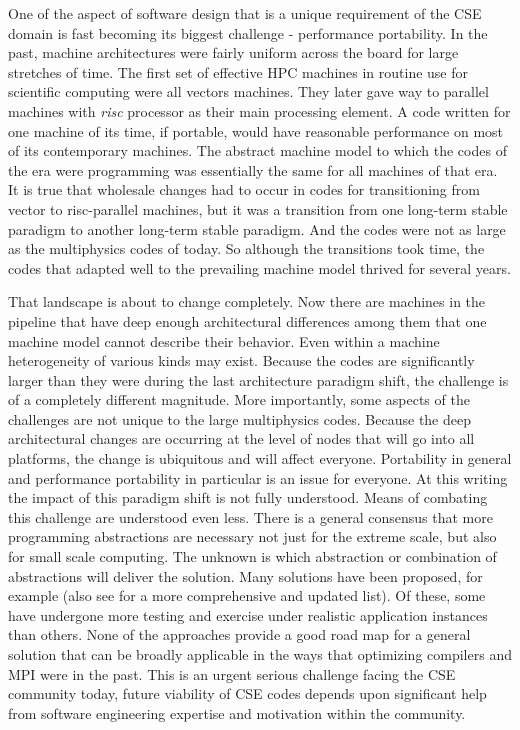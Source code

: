 \label{sec:future}

One of the aspect of software design that is a unique requirement of
the CSE domain is fast becoming its biggest challenge - performance
portability. In the past, machine architectures were fairly uniform
across the board for large stretches of time. The first set of
effective HPC machines in routine use for scientific computing were
all vectors machines. They later gave way to parallel machines with
{\em risc} processor as their main processing element. A code written
for one machine of its time, if portable, would have reasonable
performance on most of its contemporary machines. The abstract machine
model to which the codes of the era were programming was essentially
the same for all machines of that era. It is true that wholesale changes had to occur
in codes for transitioning from vector to risc-parallel machines, but
it was a transition from one long-term stable paradigm to another
long-term stable paradigm. And the codes were not as large as the
multiphysics codes of today. So although the transitions took time, the
codes that adapted well to the prevailing machine model thrived for
several years.  

That landscape is about to change completely. Now there are machines
in the pipeline that have deep enough architectural differences among
them that one machine model cannot describe their behavior. Even
within a machine heterogeneity of various kinds may exist. Because
the codes are significantly larger than they were during the last
architecture paradigm shift, the challenge is of a
completely different magnitude. More importantly, some aspects of the
challenges are not unique to the large multiphysics codes. Because the
deep architectural changes are occurring at the level of nodes that
will go into all platforms, the change is ubiquitous and will
affect everyone. Portability in general and performance
portability in particular is an issue for everyone. At this writing
the impact of this paradigm shift is not fully understood. Means of
combating this challenge are understood even less. There is a general
consensus that more programming abstractions are necessary not just
for the extreme scale, but also for small scale computing. The unknown
is which abstraction or combination of abstractions will deliver the
solution. Many solutions have been proposed, for example \cite{PADAL14} (also
see \cite{IDEAS} for a more comprehensive and updated
list). Of these, some have undergone more testing and exercise under
realistic application instances than others. None of the approaches
provide a good road map for a general solution that can be broadly
applicable in the ways that optimizing compilers and MPI were
in the past. This is an urgent serious challenge facing the CSE
community today, future viability of CSE codes depends upon
significant help from software engineering expertise and motivation
within the community. 

